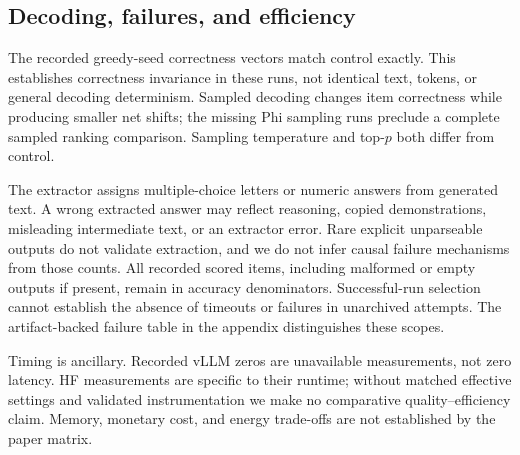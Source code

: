 \subsection{Decoding, failures, and efficiency}
The recorded greedy-seed correctness vectors match control exactly. This establishes correctness invariance in these runs, not identical text, tokens, or general decoding determinism. Sampled decoding changes item correctness while producing smaller net shifts; the missing Phi sampling runs preclude a complete sampled ranking comparison. Sampling temperature and top-$p$ both differ from control.

The extractor assigns multiple-choice letters or numeric answers from generated text. A wrong extracted answer may reflect reasoning, copied demonstrations, misleading intermediate text, or an extractor error. Rare explicit unparseable outputs do not validate extraction, and we do not infer causal failure mechanisms from those counts. All recorded scored items, including malformed or empty outputs if present, remain in accuracy denominators. Successful-run selection cannot establish the absence of timeouts or failures in unarchived attempts. The artifact-backed failure table in the appendix distinguishes these scopes.

Timing is ancillary. Recorded vLLM zeros are unavailable measurements, not zero latency. HF measurements are specific to their runtime; without matched effective settings and validated instrumentation we make no comparative quality--efficiency claim. Memory, monetary cost, and energy trade-offs are not established by the paper matrix.
